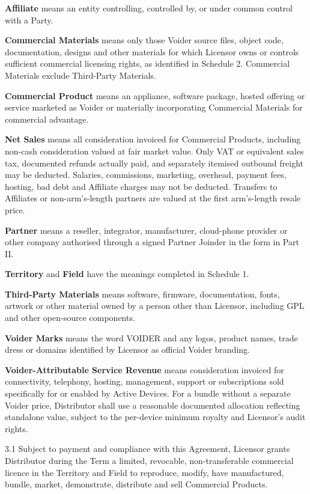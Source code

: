 \documentclass[11pt,a4paper]{article}
\newcommand{\articleheading}[2]{%
  \par\medskip{\large\bfseries\color{voiderblue}#1\quad #2}\par\smallskip
}
\begin{document}
\textbf{Affiliate} means an entity controlling, controlled by, or under common control with a Party.

\textbf{Commercial Materials} means only those Voider source files, object code, documentation, designs and other materials for which Licensor owns or controls sufficient commercial licensing rights, as identified in Schedule 2. Commercial Materials exclude Third-Party Materials.

\textbf{Commercial Product} means an appliance, software package, hosted offering or service marketed as Voider or materially incorporating Commercial Materials for commercial advantage.

\textbf{Net Sales} means all consideration invoiced for Commercial Products, including non-cash consideration valued at fair market value. Only VAT or equivalent sales tax, documented refunds actually paid, and separately itemised outbound freight may be deducted. Salaries, commissions, marketing, overhead, payment fees, hosting, bad debt and Affiliate charges may not be deducted. Transfers to Affiliates or non-arm's-length partners are valued at the first arm's-length resale price.

\textbf{Partner} means a reseller, integrator, manufacturer, cloud-phone provider or other company authorised through a signed Partner Joinder in the form in Part II.

\textbf{Territory} and \textbf{Field} have the meanings completed in Schedule 1.

\textbf{Third-Party Materials} means software, firmware, documentation, fonts, artwork or other material owned by a person other than Licensor, including GPL and other open-source components.

\textbf{Voider Marks} means the word VOIDER and any logos, product names, trade dress or domains identified by Licensor as official Voider branding.

\textbf{Voider-Attributable Service Revenue} means consideration invoiced for connectivity, telephony, hosting, management, support or subscriptions sold specifically for or enabled by Active Devices. For a bundle without a separate Voider price, Distributor shall use a reasonable documented allocation reflecting standalone value, subject to the per-device minimum royalty and Licensor's audit rights.

\articleheading{3.}{Commercial licence grant}

3.1 Subject to payment and compliance with this Agreement, Licensor grants Distributor during the Term a limited, revocable, non-transferable commercial licence in the Territory and Field to reproduce, modify, have manufactured, bundle, market, demonstrate, distribute and sell Commercial Products.
\end{document}

